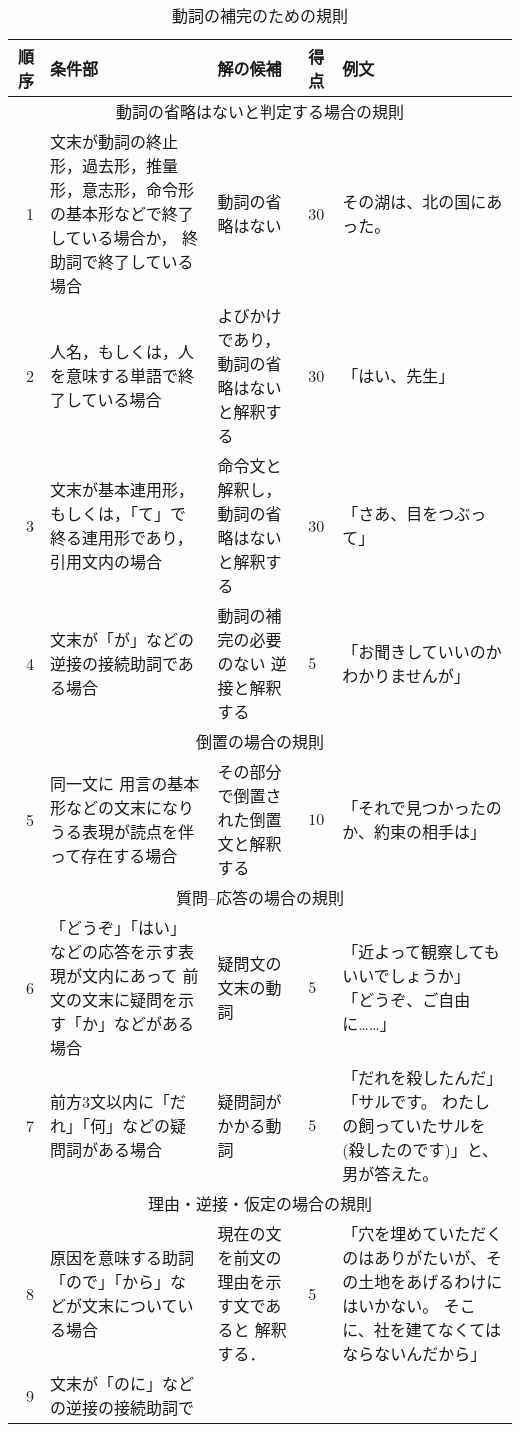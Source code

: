 \begin{table}[t]
  \footnotesize
  \caption{動詞の補完のための規則}
    \label{tab:doushi_shouryaku_bunrui}
  \begin{center}
\begin{tabular}[c]{|@{ }r@{ }|p{4cm}|p{3cm}|@{ }p{0.6cm}@{ }|p{3.9cm}|}\hline
  順序  & 条件部 & 解の候補 & 得点  & 例文\\\hline
\multicolumn{5}{|c|}{動詞の省略はないと判定する場合の規則}\\\hline
  1 &
  文末が動詞の終止形，過去形，推量形，意志形，命令形
  の基本形などで終了している場合か，
  終助詞で終了している場合 &
  動詞の省略はない &
  30 & 
  その湖は、北の国にあった。\\
  2&
  人名，もしくは，人を意味する単語で終了している場合 &
  よびかけであり，動詞の省略はないと解釈する &
  30 &
  「はい、先生」\\
  3&
  文末が基本連用形，もしくは，「て」で終る連用形であり，
  引用文内の場合&
  命令文と解釈し，動詞の省略はないと解釈する&
  30&
  「さあ、目をつぶって」\\
  4&
  文末が「が」などの逆接の接続助詞である場合&
  動詞の補完の必要のない
  逆接と解釈する&
  $5$&
  「お聞きしていいのかわかりませんが」
  \\\hline
\multicolumn{5}{|c|}{倒置の場合の規則}\\\hline
5&
  同一文に
  用言の基本形などの文末になりうる表現が読点を伴って存在する場合&
  その部分で倒置された倒置文と解釈する&
  $10$&
  「それで見つかったのか、約束の相手は」\\\hline
\multicolumn{5}{|c|}{質問--応答の場合の規則}\\\hline
6&
「どうぞ」「はい」などの応答を示す表現が文内にあって
  前文の文末に疑問を示す「か」などがある場合&
  疑問文の文末の動詞&
  $5$&
  「近よって観察してもいいでしょうか」
  「どうぞ、ご自由に……」
  \\
  7&
  前方3文以内に「だれ」「何」などの疑問詞がある場合&
  疑問詞がかかる動詞&
  $5$&
  「だれを殺したんだ」
  「サルです。
  わたしの飼っていたサルを(殺したのです)」と、男が答えた。\\\hline
\multicolumn{5}{|c|}{理由・逆接・仮定の場合の規則}\\\hline
  8&
  原因を意味する助詞「ので」「から」などが文末についている場合 &
  現在の文を前文の理由を示す文であると
  解釈する．&
  5 &
  「穴を埋めていただくのはありがたいが、その土地をあげるわけにはいかない。
  そこに、社を建てなくてはならないんだから」\\\hline
  9&
  文末が「のに」などの逆接の接続助詞で

\end{tabular}
\end{center}
\end{table}
